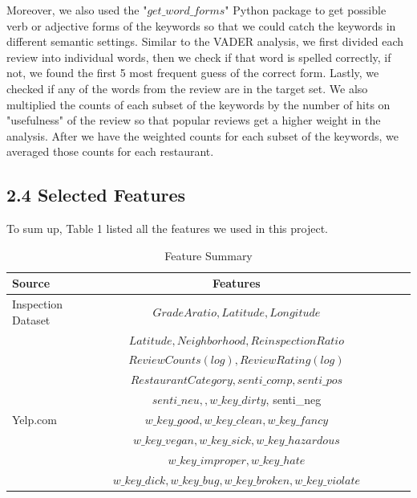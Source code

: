 \documentclass[letterpaper, 11 pt, conference]{ieeeconf}
\begin{document}
Moreover, we also used the "$get\_word\_forms$" Python package to get possible verb or adjective forms of the keywords so that we could catch the keywords in different semantic settings. Similar to the VADER analysis, we first divided each review into individual words, then we check if that word is spelled correctly, if not, we found the first 5 most frequent guess of the correct form. Lastly, we checked if any of the words from the review are in the target set. We also multiplied the counts of each subset of the keywords by the number of hits on "usefulness" of the review so that popular reviews get a higher weight in the analysis. After we have the weighted counts for each subset of the keywords, we averaged those counts for each restaurant. 

\subsection*{2.4 Selected Features}
To sum up, Table 1 listed all the features we used in this project. 

\begin {table}
\caption {Feature Summary}
\begin{center}
	\tiny
	\begin{tabular}{l*{4}{c}r}
    \hline
	Source& Features\\
    \hline
    Inspection Dataset& $Grade A ratio,Latitude, Longitude$\\
    &$Latitude, Neighborhood, Reinspection Ratio$\\
    \hline
    & $Review Counts(log), Review Rating(log)$\\  &$Restaurant Category, senti\_comp, senti\_pos$\\ &$senti\_neu, , w\_key\_dirty$, senti\_neg \\
    Yelp.com&$w\_key\_good, w\_key\_clean, w\_key\_fancy$\\
    &$w\_key\_vegan, w\_key\_sick, w\_key\_hazardous$\\
    &$w\_key\_improper, w\_key\_hate$ \\
    &$w\_key\_dick, w\_key\_bug, w\_key\_broken, w\_key\_violate$ \\
    \hline
	\end{tabular}
\end{center}
\end{table}
\end{document}
